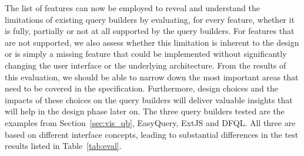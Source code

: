 \documentclass[11pt,a4paper]{globis-book}
\begin{document}
The list of features can now be employed to reveal and understand the limitations of existing query builders by evaluating, for every feature, whether it is fully, partially or not at all supported by the query builders. For features that are not supported, we also assess whether this limitation is inherent to the design or is simply a missing feature that could be implemented without significantly changing the user interface or the underlying architecture. From the results of this evaluation, we should be able to narrow down the most important areas that need to be covered in the specification. Furthermore, design choices and the impacts of these choices on the query builders will deliver valuable insights that will help in the design phase later on. The three query builders tested are the examples from Section~\ref{sec:vis_qb}, EasyQuery, ExtJS and DFQL. All three are based on different interface concepts, leading to substantial differences in the test results listed in Table~\ref{tab:eval}.
\end{document}
